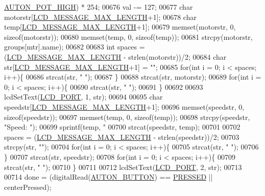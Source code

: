 \begin{DoxyCode}
{{{{{{{{{{      \hyperlink{autonrecorder_8h_a01989d89b8bed150d0aacdaef5ccabd3}{AUTON\_POT\_HIGH}) * 254;
00676         val -= 127;
00677         \textcolor{keywordtype}{char} motorstr[\hyperlink{lcdmsg_8h_abe4c4b70fc6f44ae3680e5b2c68cdd00}{LCD\_MESSAGE\_MAX\_LENGTH}+1];
00678         \textcolor{keywordtype}{char} temp[\hyperlink{lcdmsg_8h_abe4c4b70fc6f44ae3680e5b2c68cdd00}{LCD\_MESSAGE\_MAX\_LENGTH}+1];
00679         memset(motorstr, 0, \textcolor{keyword}{sizeof}(motorstr));
00680         memset(temp, 0, \textcolor{keyword}{sizeof}(temp));
00681         strcpy(motorstr, groups[mtr].name);
00682 
00683         \textcolor{keywordtype}{int} spaces = (\hyperlink{lcdmsg_8h_abe4c4b70fc6f44ae3680e5b2c68cdd00}{LCD\_MESSAGE\_MAX\_LENGTH} - strlen(motorstr))/2;
00684         \textcolor{keywordtype}{char} str[\hyperlink{lcdmsg_8h_abe4c4b70fc6f44ae3680e5b2c68cdd00}{LCD\_MESSAGE\_MAX\_LENGTH}+1] = \textcolor{stringliteral}{""};
00685         \textcolor{keywordflow}{for}(\textcolor{keywordtype}{int} i = 0; i < spaces; i++)\{
00686             strcat(str, \textcolor{stringliteral}{" "});
00687         \}
00688         strcat(str, motorstr);
00689         \textcolor{keywordflow}{for}(\textcolor{keywordtype}{int} i = 0; i < spaces; i++)\{
00690             strcat(str, \textcolor{stringliteral}{" "});
00691         \}
00692 
00693         lcdSetText(\hyperlink{lcdmsg_8h_abcf42bd88b3c36193f301ca25b033875}{LCD\_PORT}, 1, str);
00694 
00695         \textcolor{keywordtype}{char} speedstr[\hyperlink{lcdmsg_8h_abe4c4b70fc6f44ae3680e5b2c68cdd00}{LCD\_MESSAGE\_MAX\_LENGTH}+1];
00696         memset(speedstr, 0, \textcolor{keyword}{sizeof}(speedstr));
00697         memset(temp, 0, \textcolor{keyword}{sizeof}(temp));
00698         strcpy(speedstr, \textcolor{stringliteral}{"Speed: "});
00699         sprintf(temp, \textcolor{stringliteral}{"%
00700         strcat(speedstr, temp);
00701 
00702         spaces = (\hyperlink{lcdmsg_8h_abe4c4b70fc6f44ae3680e5b2c68cdd00}{LCD\_MESSAGE\_MAX\_LENGTH} - strlen(speedstr))/2;
00703         strcpy(str, \textcolor{stringliteral}{""});
00704         \textcolor{keywordflow}{for}(\textcolor{keywordtype}{int} i = 0; i < spaces; i++)\{
00705             strcat(str, \textcolor{stringliteral}{" "});
00706         \}
00707         strcat(str, speedstr);
00708         \textcolor{keywordflow}{for}(\textcolor{keywordtype}{int} i = 0; i < spaces; i++)\{
00709             strcat(str, \textcolor{stringliteral}{" "});
00710         \}
00711 
00712         lcdSetText(\hyperlink{lcdmsg_8h_abcf42bd88b3c36193f301ca25b033875}{LCD\_PORT}, 2, str);
00713 
00714         done = (digitalRead(\hyperlink{autonrecorder_8h_a5e5e9512ca0c5f741113ae51b24258c1}{AUTON\_BUTTON}) == \hyperlink{friendly_8h_a654adff3c664f27f0b29c24af818dd26}{PRESSED} || centerPressed);
}}}}}}}}}}}
\end{DoxyCode}
